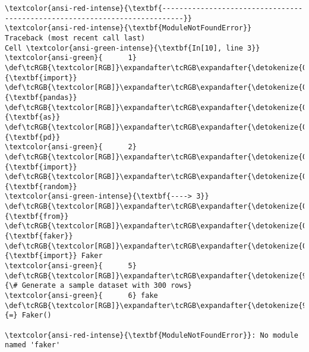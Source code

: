 \documentclass[11pt]{article}
\begin{document}
    \begin{Verbatim}[commandchars=\\\{\}, frame=single, framerule=2mm, rulecolor=\color{outerrorbackground}]
\textcolor{ansi-red-intense}{\textbf{---------------------------------------------------------------------------}}
\textcolor{ansi-red-intense}{\textbf{ModuleNotFoundError}}                       Traceback (most recent call last)
Cell \textcolor{ansi-green-intense}{\textbf{In[10], line 3}}
\textcolor{ansi-green}{      1} \def\tcRGB{\textcolor[RGB]}\expandafter\tcRGB\expandafter{\detokenize{0,135,0}}{\textbf{import}} \def\tcRGB{\textcolor[RGB]}\expandafter\tcRGB\expandafter{\detokenize{0,0,255}}{\textbf{pandas}} \def\tcRGB{\textcolor[RGB]}\expandafter\tcRGB\expandafter{\detokenize{0,135,0}}{\textbf{as}} \def\tcRGB{\textcolor[RGB]}\expandafter\tcRGB\expandafter{\detokenize{0,0,255}}{\textbf{pd}}
\textcolor{ansi-green}{      2} \def\tcRGB{\textcolor[RGB]}\expandafter\tcRGB\expandafter{\detokenize{0,135,0}}{\textbf{import}} \def\tcRGB{\textcolor[RGB]}\expandafter\tcRGB\expandafter{\detokenize{0,0,255}}{\textbf{random}}
\textcolor{ansi-green-intense}{\textbf{----> 3}} \def\tcRGB{\textcolor[RGB]}\expandafter\tcRGB\expandafter{\detokenize{0,135,0}}{\textbf{from}} \def\tcRGB{\textcolor[RGB]}\expandafter\tcRGB\expandafter{\detokenize{0,0,255}}{\textbf{faker}} \def\tcRGB{\textcolor[RGB]}\expandafter\tcRGB\expandafter{\detokenize{0,135,0}}{\textbf{import}} Faker
\textcolor{ansi-green}{      5} \def\tcRGB{\textcolor[RGB]}\expandafter\tcRGB\expandafter{\detokenize{95,135,135}}{\# Generate a sample dataset with 300 rows}
\textcolor{ansi-green}{      6} fake \def\tcRGB{\textcolor[RGB]}\expandafter\tcRGB\expandafter{\detokenize{98,98,98}}{=} Faker()

\textcolor{ansi-red-intense}{\textbf{ModuleNotFoundError}}: No module named 'faker'
    \end{Verbatim}
\end{document}
